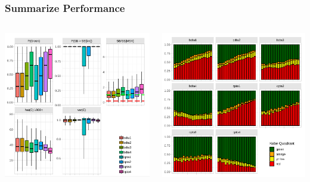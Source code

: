 \documentclass{beamer}
\begin{document}
\begin{frame}
	\frametitle{Summarize Performance}
	
	\begin{columns}[c] %
		
		\begin{column}{0.5\textwidth}
			\centering
			\includegraphics[height=0.7\textheight]{figs/perf1.png}
		\end{column}
		
		\begin{column}{0.5\textwidth}
			\centering
			\includegraphics[height=0.7\textheight]{figs/perf2.png}
		\end{column}
		

\end{columns}
\end{frame}
\end{document}
